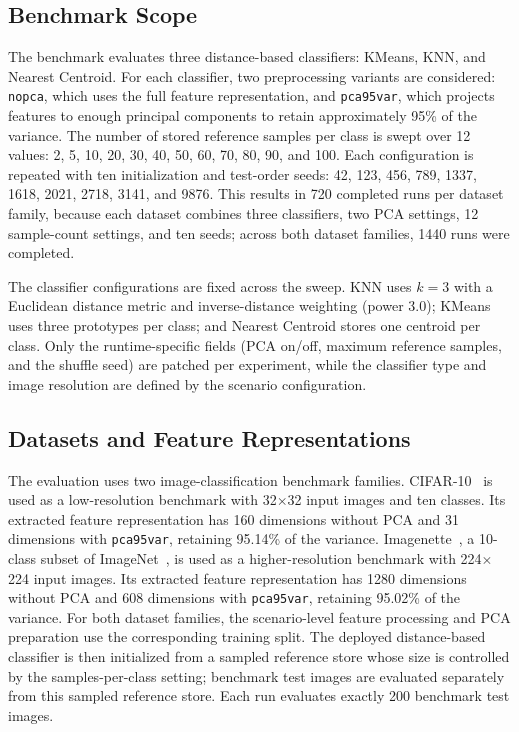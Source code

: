 \documentclass[sigconf,review]{acmart}
\begin{document}
\subsection{Benchmark Scope}
\label{sec:scope}
The benchmark evaluates three distance-based classifiers: KMeans, KNN, and Nearest Centroid.
For each classifier, two preprocessing variants are considered: \texttt{nopca}, which uses the full feature representation, and \texttt{pca95var}, which projects features to enough principal components to retain approximately 95\% of the variance.
The number of stored reference samples per class is swept over 12 values: 2, 5, 10, 20, 30, 40, 50, 60, 70, 80, 90, and 100.
Each configuration is repeated with ten initialization and test-order seeds: 42, 123, 456, 789, 1337, 1618, 2021, 2718, 3141, and 9876.
This results in 720 completed runs per dataset family, because each dataset combines three classifiers, two PCA settings, 12 sample-count settings, and ten seeds; across both dataset families, 1440 runs were completed.

The classifier configurations are fixed across the sweep.
KNN uses $k=3$ with a Euclidean distance metric and inverse-distance weighting (power 3.0); KMeans uses three prototypes per class; and Nearest Centroid stores one centroid per class.
Only the runtime-specific fields (PCA on/off, maximum reference samples, and the shuffle seed) are patched per experiment, while the classifier type and image resolution are defined by the scenario configuration.

\subsection{Datasets and Feature Representations}
The evaluation uses two image-classification benchmark families.
CIFAR-10~\cite{krizhevsky2009cifar} is used as a low-resolution benchmark with 32$\times$32 input images and ten classes.
Its extracted feature representation has 160 dimensions without PCA and 31 dimensions with \texttt{pca95var}, retaining 95.14\% of the variance.
Imagenette~\cite{howard2019imagenette}, a 10-class subset of ImageNet~\cite{deng2009imagenet}, is used as a higher-resolution benchmark with 224$\times$224 input images.
Its extracted feature representation has 1280 dimensions without PCA and 608 dimensions with \texttt{pca95var}, retaining 95.02\% of the variance.
For both dataset families, the scenario-level feature processing and PCA preparation use the corresponding training split.
The deployed distance-based classifier is then initialized from a sampled reference store whose size is controlled by the samples-per-class setting; benchmark test images are evaluated separately from this sampled reference store.
Each run evaluates exactly 200 benchmark test images.
\end{document}
